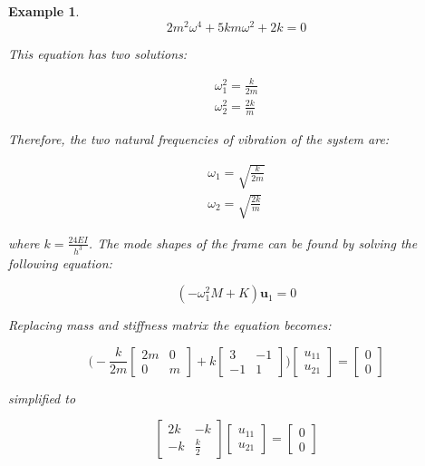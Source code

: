 \documentclass[12pt,letter]{article}
\newtheorem{ex}{Example}
\numberwithin{ex}{section} %
\newenvironment{example}{\begin{mdframed}[middlelinewidth=0.5mm]\begin{ex}\normalfont}{\end{ex}\end{mdframed}}
\numberwithin{re}{section} %
\begin{document}
\begin{example}
\begin{equation}
2m^2 \omega^4 + 5 k m \omega^2 + 2 k = 0
\end{equation}

\noindent This equation has two solutions:

\begin{eqnarray}
\omega_1^2 = \frac{k}{2 m}\\
\omega_2^2 = \frac{2 k}{m}
\end{eqnarray}

\noindent Therefore, the two natural frequencies of vibration of the system are:

\begin{eqnarray}
\omega_1 = \sqrt{\frac{k}{2 m}}\\
\omega_2 = \sqrt{\frac{2 k}{m}}
\end{eqnarray}

\noindent where $k = \frac{24EI}{h^3}$. The mode shapes of the frame can be found by solving the following equation:

\begin{equation}
(-\omega_1^2 M  + K)\mathbf{u}_1 =0
\end{equation}

\noindent Replacing mass and stiffness matrix the equation becomes:

\begin{equation}
\bigg(-\frac{k}{2 m}\begin{bmatrix}  2m & 0 \\   0  & m \end{bmatrix} + k \begin{bmatrix} 3 & -1 \\    -1  & 1 \end{bmatrix}\bigg)\begin{bmatrix} u_{11}\\ u_{21}\end{bmatrix} = \begin{bmatrix} 0\\ 0\end{bmatrix}
\end{equation}

\noindent simplified to

\begin{equation}
\begin{bmatrix} 2k & -k \\    -k  & \frac{k}{2} \end{bmatrix} 
\begin{bmatrix} u_{11}\\ u_{21}\end{bmatrix}=\begin{bmatrix} 0\\ 0\end{bmatrix}
\end{equation}


\end{example}
\end{document}
